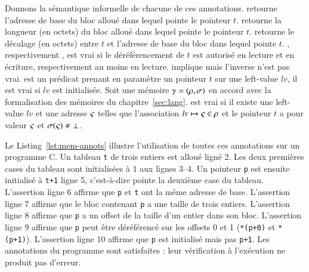 Donnons la sémantique informelle de chacune de ces annotations.
\baseaddrt retourne l'adresse de base du bloc alloué dans lequel pointe le
pointeur $t$.
\blocklengtht retourne la longueur (en octets) du bloc alloué dans lequel
pointe le pointeur $t$.
\offsett retourne le décalage (en octets) entre $t$ et l'adresse de
base du bloc dans lequel pointe $t$.
\validt, respectivement \validreadt, est vrai si le déréférencement de
$t$ est autorisé en lecture et en écriture, respectivement au moins en
lecture.
\validt implique \validreadt mais l'inverse n'est pas vrai.
\initializedt est un prédicat prenant en paramètre un pointeur $t$ sur une
left-value $lv$, il est vrai si $lv$ est initialisée.
Soit une mémoire $\gamma = (\rho, \sigma)$ en accord avec la formalisation des
mémoires du chapitre~\ref{sec:lang}.
\initializedt est vrai si il existe une left-value $lv$ et une adresse $\varsigma$
telles que l'association $lv \mapsto \varsigma \in \rho$ et le pointeur $t$ a pour
valeur $\varsigma$ et $\sigma(\varsigma) \neq \bot$.




\begin{figure}[h!]

\end{figure}


Le Listing~\ref{lst:mem-annots} illustre l'utilisation de toutes ces annotations
sur un programme C.
Un tableau \lstinline't' de trois entiers est alloué ligné 2.
Les deux premières cases du tableau sont initialisées à 1 aux lignes 3--4.
Un pointeur \lstinline'p' est ensuite initialisé à \lstinline't+1' ligne 5,
c'est-à-dire pointe la deuxième case du tableau.
L'assertion ligne 6 affirme que \lstinline'p' et \lstinline't' ont la même
adresse de base.
L'assertion ligne 7 affirme que le bloc contenant \lstinline'p' a une taille de
trois entiers.
L'assertion ligne 8 affirme que \lstinline'p' a un offset de la taille d'un
entier dans son bloc.
L'assertion ligne 9 affirme que \lstinline'p' peut être déréférencé sur les
offsets 0 et 1 (\lstinline'*(p+0)' et \lstinline'*(p+1)').
L'assertion ligne 10 affirme que \lstinline'p' est initialisé mais pas
\lstinline'p+1'.
Les annotations du programme sont satisfaites : leur vérification à l'exécution
ne produit pas d'erreur.

